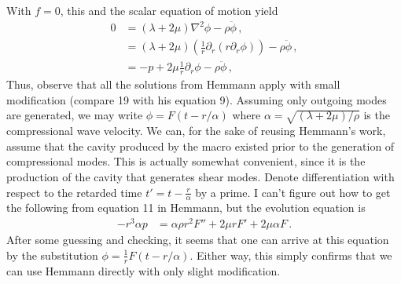 \documentclass{article}
\newcommand*\p[1]{\left(#1\right)}
\newcommand*\f[2]{\frac{#1}{#2}}
\begin{document}
With $f=0$, this and the scalar equation of motion yield
\begin{align}
0&=(\lambda+2\mu)\nabla^2\phi-\rho\ddot\phi\,,\\
&=(\lambda+2\mu)\p{\f1r\partial_r\p{r\partial_r\phi}}-\rho\ddot\phi\,,\\
&=-p+2\mu\f1r\partial_r\phi-\rho\ddot\phi\,,
\end{align}
Thus, observe that all the solutions from Hemmann apply with small modification (compare 19 with his equation 9).
Assuming only outgoing modes are generated, we may write $\phi=F(t-r/\alpha)$ where $\alpha=\sqrt{(\lambda+2\mu)/\rho}$ is the compressional wave velocity. We can, for the sake of reusing Hemmann's work, assume that the cavity produced by the macro existed prior to the generation of compressional modes. This is actually somewhat convenient, since it is the production of the cavity that generates shear modes. Denote differentiation with respect to the retarded time $t'=t-\f r\alpha$ by a prime. I can't figure out how to get the following from equation 11 in Hemmann, but the evolution equation is
\begin{align}
-r^3\alpha p&=\alpha\rho r^2 F''+2\mu r F'+2\mu\alpha F\,.
\end{align}
After some guessing and checking, it seems that one can arrive at this equation by the substitution $\phi=\f1rF(t-r/\alpha)$. Either way, this simply confirms that we can use Hemmann directly with only slight modification.
\end{document}
